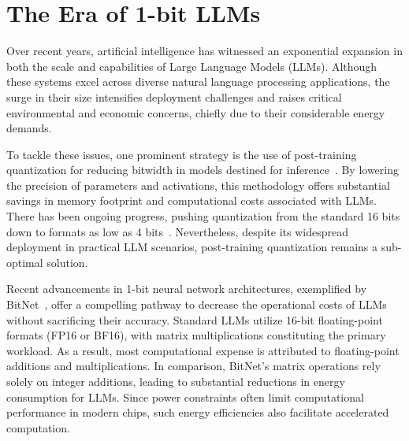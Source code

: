\begin{abstract}
Advancements like BitNet~\cite{bitnet} have initiated a transformative phase in the realm of 1-bit Large Language Models (LLMs). In this study, we present \textbf{}, a novel 1-bit LLM configuration, wherein every model parameter (or weight) is restricted to ternary values from the set \{-1, 0, 1\}. Despite the drastic reduction in representation precision, this approach achieves parity with traditional full-precision (FP16 or BF16) Transformer LLMs of identical model scale and training regime in terms of perplexity as well as performance on downstream tasks. At the same time, it brings significant improvements in efficiency—reducing latency, memory consumption, throughput bottlenecks, and energy usage. Beyond empirical gains, this 1.58-bit LLM establishes a new scaling law, offering guidance for the development of future generations of LLMs that balance strong performance with cost efficiency. In addition, it paves the way for new computational paradigms and motivates the design of specialized hardware tailored for 1-bit LLM operations.
\end{abstract}

\section{The Era of 1-bit LLMs}

Over recent years, artificial intelligence has witnessed an exponential expansion in both the scale and capabilities of Large Language Models (LLMs). Although these systems excel across diverse natural language processing applications, the surge in their size intensifies deployment challenges and raises critical environmental and economic concerns, chiefly due to their considerable energy demands.

To tackle these issues, one prominent strategy is the use of post-training quantization for reducing bitwidth in models destined for inference~\cite{smoothquant, gptq, quip, quip_sharp}. By lowering the precision of parameters and activations, this methodology offers substantial savings in memory footprint and computational costs associated with LLMs. There has been ongoing progress, pushing quantization from the standard 16 bits down to formats as low as 4 bits~\cite{gptq, awq}. Nevertheless, despite its widespread deployment in practical LLM scenarios, post-training quantization remains a sub-optimal solution.

Recent advancements in 1-bit neural network architectures, exemplified by BitNet~\cite{bitnet}, offer a compelling pathway to decrease the operational costs of LLMs without sacrificing their accuracy. Standard LLMs utilize 16-bit floating-point formats (FP16 or BF16), with matrix multiplications constituting the primary workload. As a result, most computational expense is attributed to floating-point additions and multiplications. In comparison, BitNet's matrix operations rely solely on integer additions, leading to substantial reductions in energy consumption for LLMs. Since power constraints often limit computational performance in modern chips, such energy efficiencies also facilitate accelerated computation.

